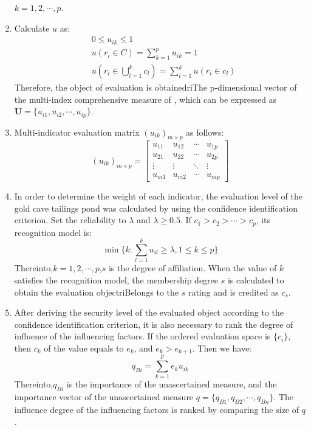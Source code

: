 \documentclass[12pt]{article}  %
\begin{document}
\begin{enumerate}
\hspace{4.5em}$k=1,2,\cdots ,p$.
\item Calculate $u$ as:
\begin{eqnarray}
    &0\le u_{ik}\le 1\\
    &u(r_i\in C)=\sum_{k=1}^{p}u_{ik}=1\\
    &u(r_i\in \bigcup_{l=1}^{k}c_l)=\sum_{l=1}^{k}u(r_i\in c_l)
\end{eqnarray}
Therefore, the object of evaluation is obtainedriThe p-dimensional vector of the multi-index comprehensive measure of , which can be expressed as $\bm{U}=\{u_{i1},u_{i2},\cdots ,u_{ip}\}$. 
\item Multi-indicator evaluation matrix $(u_{ik})_{m\times p}$ as follows:
\begin{equation}
    (u_{ik})_{m\times p}=\begin{bmatrix}
 u_{11} &u_{12}  &\cdots   &u_{1p} \\
  u_{21}&u_{22}  & \cdots  &u_{2p} \\
  \vdots & \vdots &  \ddots & \vdots\\
 u_{m1} &u_{m2}  &\cdots   &u_{mp}
\end{bmatrix} 
\end{equation}
    \item In order to determine the weight of each indicator, the evaluation level of the gold cave tailings pond was calculated by using the confidence identification criterion. Set the reliability to $\lambda$ and $\lambda \ge 0.5$. If $c_1>c_2>\cdots >c_p$, its recognition model is:
    \begin{equation}
        \min \{k:\sum_{l=1}^{k}u_{il}\ge \lambda,1\le k\le p\}
    \end{equation}
Thereinto,$k=1,2,\cdots ,p$,$s$ is the degree of affiliation. When the value of $k$ satisfies the recognition model, the membership degree $s$ is calculated to obtain the evaluation objectriBelongs to the $s$ rating and is credited as $c_s$.
    \item After deriving the security level of the evaluated object according to the confidence identification criterion, it is also necessary to rank the degree of influence of the influencing factors. If the ordered evaluation space is $\{c_i\}$, then $c_k$ of the value equals to $e_k$, and $e_k>e_{k+1}$. Then we have:
    \begin{equation}
        q_{Bi}=\sum_{k=1}^{p}e_ku_{ik}
    \end{equation}
Thereinto,$q_{Bi}$ is the importance of the unascertained measure, and the importance vector of the unascertained measure $q=\{q_{B1}, q_{B2},\cdots , q_{Bn}\}$. The influence degree of the influencing factors is ranked by comparing the size of \rm{$q$}.
\end{enumerate}
\end{document}

